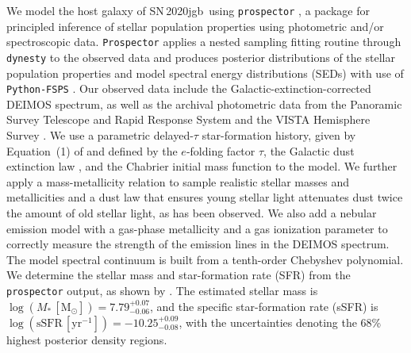 \documentclass[twocolumn]{aastex631}
\newcommand{\sn}{SN\,2020jgb}
\begin{document}
We model the host galaxy of \sn\ using \texttt{prospector} \citep{Johnson_prospector_2021}, a package for principled inference of stellar population properties using photometric and/or spectroscopic data. \texttt{Prospector} applies a nested sampling fitting routine through \texttt{dynesty} \citep{Speagle_dynesty_2020} to the observed data and produces posterior distributions of the stellar population properties and model spectral energy distributions (SEDs) with use of \texttt{Python-FSPS} \citep{Conroy_2009,Conroy_2010}. Our observed data include the Galactic-extinction-corrected DEIMOS spectrum, as well as the archival photometric data from the Panoramic Survey Telescope and Rapid Response System \citep[Pan-STARRS;][$g$, $r$, $i$, $z$, $y$ Kron magnitudes]{PS1_2016}  and the VISTA Hemisphere Survey \citep[VHS;][$J$ and $K_s$ Petrosian magnitudes]{VHS_2013}. We use a parametric delayed-$\tau$ star-formation history, given by Equation~(1) of \citet{Nugent_2020} and defined by the $e$-folding factor $\tau$, the Galactic dust extinction law \citep{Cardelli_1989}, and the Chabrier initial mass function \citep{Chabrier_2003} to the model. We further apply a mass-metallicity relation \citep{Gallazzi_2005} to sample realistic stellar masses and metallicities and a dust law that ensures young stellar light attenuates dust twice the amount of old stellar light, as has been observed.  We also add a nebular emission model with a gas-phase metallicity and a gas ionization parameter to correctly measure the strength of the emission lines in the DEIMOS spectrum. The model spectral continuum is built from a tenth-order Chebyshev polynomial. We determine the stellar mass and star-formation rate (SFR) from the \texttt{prospector} output, as shown by \citet{Nugent_2022}. The estimated stellar mass is $\log (M_*\,[\mathrm{M_\odot}])=7.79_{-0.06}^{+0.07}$, and the specific star-formation rate (sSFR) is $\log (\mathrm{sSFR}\,[\mathrm{yr}^{-1}])=-10.25_{-0.08}^{+0.09}$, with the uncertainties denoting the 68\% highest posterior density regions.
  
\end{document}
